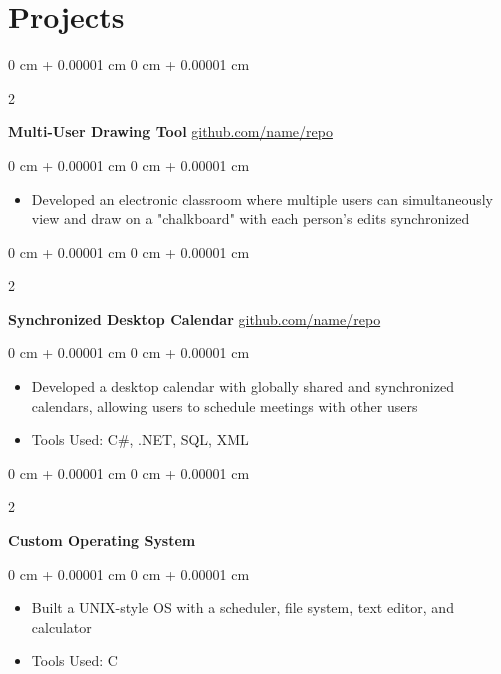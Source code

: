 \documentclass[10pt, letterpaper]{article}
\newenvironment{highlights}{
	\begin{itemize}[
		topsep=0.10 cm,
		parsep=0.10 cm,
		partopsep=0pt,
		itemsep=0pt,
		leftmargin=0 cm + 10pt
		]
	}{
	\end{itemize}
} %
\newenvironment{onecolentry}{
	\begin{adjustwidth}{
			0 cm + 0.00001 cm
		}{
			0 cm + 0.00001 cm
		}
	}{
	\end{adjustwidth}
} %
\newenvironment{twocolentry}[2][]{
	\onecolentry
	\def\secondColumn{#2}
	\setcolumnwidth{\fill, 4.5 cm}
	\begin{paracol}{2}
	}{
		\switchcolumn \raggedleft \secondColumn
	\end{paracol}
	\endonecolentry
} %
\begin{document}
	\section{Projects}
	
	
	
	
	\begin{twocolentry}{
			\href{https://github.com/sinaatalay/rendercv}{github.com/name/repo}
		}
		\textbf{Multi-User Drawing Tool}\end{twocolentry}
	
	\vspace{0.10 cm}
	\begin{onecolentry}
		\begin{highlights}
			\item Developed an electronic classroom where multiple users can simultaneously view and draw on a "chalkboard" with each person's edits synchronized
		\end{highlights}
	\end{onecolentry}
	
	
	\vspace{0.2 cm}
	
	\begin{twocolentry}{
			\href{https://github.com/sinaatalay/rendercv}{github.com/name/repo}
		}
		\textbf{Synchronized Desktop Calendar}\end{twocolentry}
	
	\vspace{0.10 cm}
	\begin{onecolentry}
		\begin{highlights}
			\item Developed a desktop calendar with globally shared and synchronized calendars, allowing users to schedule meetings with other users
			\item Tools Used: C\#, .NET, SQL, XML
		\end{highlights}
	\end{onecolentry}
	
	
	\vspace{0.2 cm}
	
	\begin{twocolentry}{
			2002
		}
		\textbf{Custom Operating System}\end{twocolentry}
	
	\vspace{0.10 cm}
	\begin{onecolentry}
		\begin{highlights}
			\item Built a UNIX-style OS with a scheduler, file system, text editor, and calculator
			\item Tools Used: C
		\end{highlights}
	\end{onecolentry}
	
\end{document}
